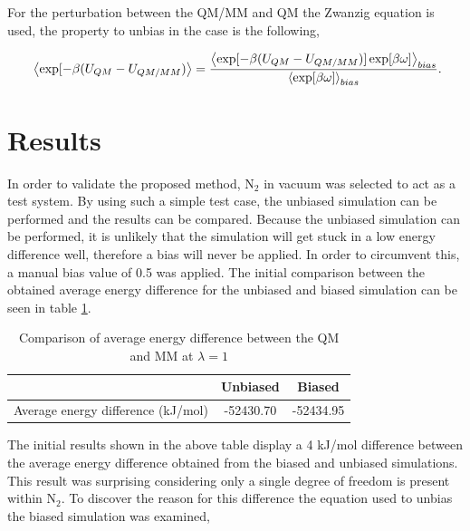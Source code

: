 For the perturbation between the QM/MM and QM the Zwanzig equation is used, the property to unbias in the case is the following,

\begin{equation}
\ \left\langle  \exp[ -\beta ( U_{QM}-U_{QM/MM}) \right\rangle = \frac{\left\langle  \exp[ -\beta ( U_{QM}-U_{QM/MM})] \exp[\beta\omega] \right\rangle_{bias}}{\left\langle \exp[\beta\omega] \right\rangle_{bias}} \\.
\end{equation}




\section{Results}

In order to validate the proposed method, N$_2$ in vacuum was selected to act as a test system.  By using such a simple test case, the unbiased simulation can be performed and the results can be compared.  Because the unbiased simulation can be performed, it is unlikely that the simulation will get stuck in a low energy difference well, therefore a bias will never be applied.  In order to circumvent this, a manual bias value of 0.5 was applied.  The initial comparison between the obtained average energy difference for the unbiased and biased simulation can be seen in table \ref{table:N2_comparison_1}.

\begin{center}
\begin{table}[ht]
{
\hfill{}
\begin{tabular}{c | c | c }
\hline 
 & Unbiased & Biased \\ 
\hline 
 Average energy difference (kJ/mol) & -52430.70 & -52434.95 \\
\hline 
\end{tabular}}
\hfill{}
\caption{Comparison of average energy difference between the QM and MM at $\lambda=1$}
\label{table:N2_comparison_1}
\end{table}
\end{center}

The initial results shown in the above table display a 4 kJ/mol difference between the average energy difference obtained from the biased and unbiased simulations.  This result was surprising considering only a single degree of freedom is present within N$_2$.  To discover the reason for this difference the equation used to unbias the biased simulation was examined,

